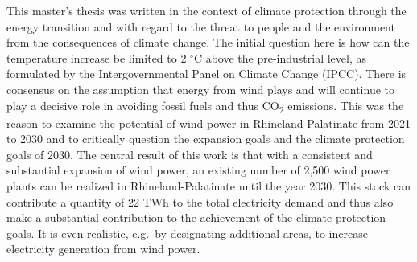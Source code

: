 \documentclass[a4paper,11pt]{article}
\begin{document}
This master's thesis was written in the context of climate protection through the energy transition and with regard to the threat to people and the environment from the consequences of climate change. The initial question here is how can the temperature increase be limited to 2 \(^\circ\)C above the pre-industrial level, as formulated by the Intergovernmental Panel on Climate Change (IPCC). There is consensus on the assumption that energy from wind plays and will continue to play a decisive role in avoiding fossil fuels and thus CO\textsubscript{2} emissions. This was the reason to examine the potential of wind power in Rhineland-Palatinate from 2021 to 2030 and to critically question the expansion goals and the climate protection goals of 2030. The central result of this work is that with a consistent and substantial expansion of wind power, an existing number of 2,500 wind power plants can be realized in Rhineland-Palatinate until the year 2030. This stock can contribute a quantity of 22 TWh to the total electricity demand and thus also make a substantial contribution to the achievement of the climate protection goals. It is even realistic, e.g.~by designating additional areas, to increase electricity generation from wind power.
\end{document}
